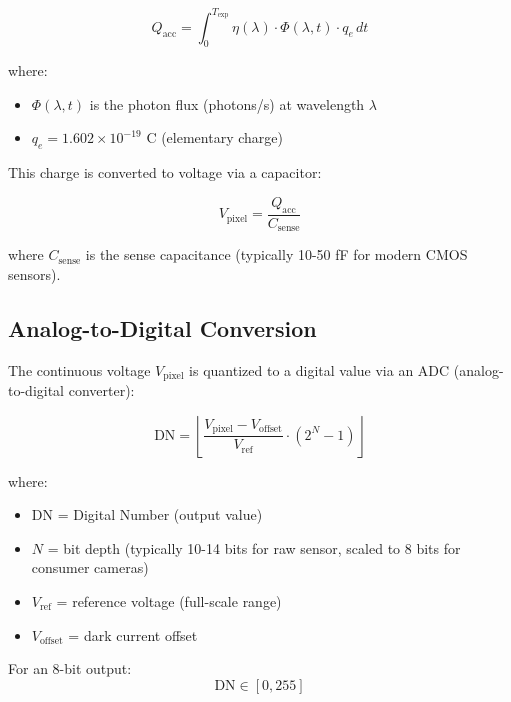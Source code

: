 \documentclass[11pt,a4paper]{article}
\begin{document}
\begin{equation}
Q_{\text{acc}} = \int_0^{T_{\text{exp}}} \eta(\lambda) \cdot \Phi(\lambda, t) \cdot q_e \, dt
\end{equation}

where:
\begin{itemize}
    \item $\Phi(\lambda, t)$ is the photon flux (photons/s) at wavelength $\lambda$
    \item $q_e = 1.602 \times 10^{-19}$ C (elementary charge)
\end{itemize}

This charge is converted to voltage via a capacitor:

\begin{equation}
V_{\text{pixel}} = \frac{Q_{\text{acc}}}{C_{\text{sense}}}
\end{equation}

where $C_{\text{sense}}$ is the sense capacitance (typically 10-50 fF for modern CMOS sensors).

\subsection{Analog-to-Digital Conversion}

The continuous voltage $V_{\text{pixel}}$ is quantized to a digital value via an ADC (analog-to-digital converter):

\begin{equation}
\text{DN} = \left\lfloor \frac{V_{\text{pixel}} - V_{\text{offset}}}{V_{\text{ref}}} \cdot (2^N - 1) \right\rfloor
\end{equation}

where:
\begin{itemize}
    \item DN = Digital Number (output value)
    \item $N$ = bit depth (typically 10-14 bits for raw sensor, scaled to 8 bits for consumer cameras)
    \item $V_{\text{ref}}$ = reference voltage (full-scale range)
    \item $V_{\text{offset}}$ = dark current offset
\end{itemize}

For an 8-bit output:
\begin{equation}
\text{DN} \in [0, 255]
\end{equation}
\end{document}
